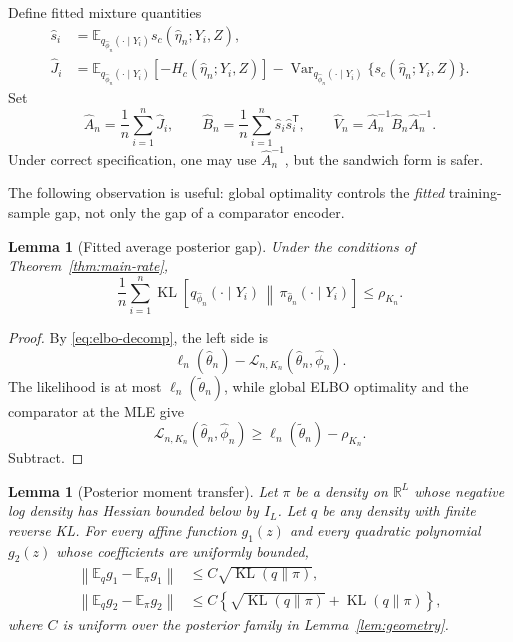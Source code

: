 \documentclass[11pt]{article}
\newtheorem{lemma}[theorem]{Lemma}
\theoremstyle{definition}
\newcommand{\R}{\mathbb R}
\newcommand{\E}{\mathbb E}
\newcommand{\KL}{\operatorname{KL}}
\newcommand{\Var}{\operatorname{Var}}
\newcommand{\trans}{\mathsf T}
\newcommand{\norm}[1]{\left\lVert #1\right\rVert}
\newcommand{\cL}{\mathcal L}
\begin{document}
Define fitted mixture quantities
\begin{align}
\widehat s_i
&=
\E_{q_{\widehat\phi_n}(\cdot\mid Y_i)}
 s_c(\widehat\eta_n;Y_i,Z),
\label{eq:q-score}\\
\widehat J_i
&=
\E_{q_{\widehat\phi_n}(\cdot\mid Y_i)}[-H_c(\widehat\eta_n;Y_i,Z)]
-
\Var_{q_{\widehat\phi_n}(\cdot\mid Y_i)}
\{s_c(\widehat\eta_n;Y_i,Z)\}.
\label{eq:q-information}
\end{align}
Set
\begin{equation}
\widehat A_n=\frac1n\sum_{i=1}^n\widehat J_i,
\qquad
\widehat B_n=\frac1n\sum_{i=1}^n\widehat s_i\widehat s_i^{\trans},
\qquad
\widehat V_n=\widehat A_n^{-1}\widehat B_n\widehat A_n^{-1}.
\label{eq:sandwich}
\end{equation}
Under correct specification, one may use $\widehat A_n^{-1}$, but the sandwich form is safer.

The following observation is useful: global optimality controls the \emph{fitted} training-sample gap, not only the gap of a comparator encoder.

\begin{lemma}[Fitted average posterior gap]
\label{lem:fitted-gap}
Under the conditions of Theorem~\ref{thm:main-rate},
\begin{equation}
\frac1n\sum_{i=1}^n
\KL\!\left[
q_{\widehat\phi_n}(\cdot\mid Y_i)
\,\middle\|\,
\pi_{\widehat\theta_n}(\cdot\mid Y_i)
\right]
\le\rho_{K_n}.
\label{eq:fitted-gap}
\end{equation}
\end{lemma}

\begin{proof}
By \cref{eq:elbo-decomp}, the left side is
\[
\ell_n(\widehat\theta_n)-\cL_{n,K_n}(\widehat\theta_n,\widehat\phi_n).
\]
The likelihood is at most $\ell_n(\widetilde\theta_n)$, while global ELBO optimality and the comparator at the MLE give
\[
\cL_{n,K_n}(\widehat\theta_n,\widehat\phi_n)
\ge
\ell_n(\widetilde\theta_n)-\rho_{K_n}.
\]
Subtract.
\end{proof}

\begin{lemma}[Posterior moment transfer]
\label{lem:moment-transfer}
Let $\pi$ be a density on $\R^L$ whose negative log density has Hessian bounded below by $I_L$. Let $q$ be any density with finite reverse KL. For every affine function $g_1(z)$ and every quadratic polynomial $g_2(z)$ whose coefficients are uniformly bounded,
\begin{align}
\norm{\E_qg_1-\E_\pi g_1}
&\le C\sqrt{\KL(q\|\pi)},
\label{eq:linear-transfer}\\
\norm{\E_qg_2-\E_\pi g_2}
&\le C\left\{\sqrt{\KL(q\|\pi)}+\KL(q\|\pi)\right\},
\label{eq:quadratic-transfer}
\end{align}
where $C$ is uniform over the posterior family in Lemma~\ref{lem:geometry}.
\end{lemma}
\end{document}

